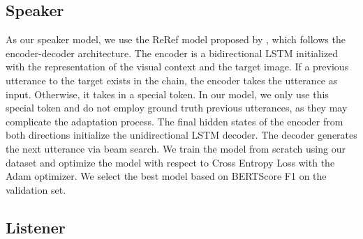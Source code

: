 \subsection{Speaker}
\label{sec:speaker}

As our speaker model, we use the ReRef model proposed by \citet{takmaz-etal-2020-refer}, which follows the encoder-decoder architecture. %
The encoder is a bidirectional LSTM initialized with the representation of the visual context and the target image. If a previous utterance to the target exists in the chain, 
the encoder takes the utterance as input. Otherwise, it takes in a special token. In our model, we only use this special token and do not employ ground truth previous utterances, as they may complicate the adaptation process. The final hidden states of the encoder from both directions initialize the unidirectional LSTM decoder. The decoder generates the next utterance via beam search. We train the model from scratch using our dataset and optimize the model with respect to Cross Entropy Loss with the Adam optimizer. We select the best model based on BERTScore F1 on the validation set. 





\subsection{Listener}
\label{sec:listener}

